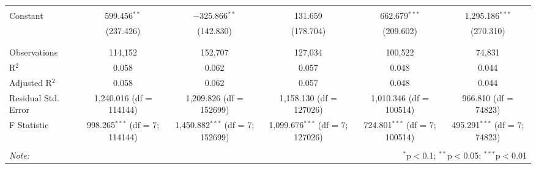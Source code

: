 \begin{table}[!htbp]
\begin{tabular}{@{\extracolsep{5pt}}lccccc}
  & & & & & \\ 
 Constant & 599.456$^{**}$ & $-$325.866$^{**}$ & 131.659 & 662.679$^{***}$ & 1,295.186$^{***}$ \\ 
  & (237.426) & (142.830) & (178.704) & (209.602) & (270.310) \\ 
  & & & & & \\ 
\hline \\[-1.8ex] 
Observations & 114,152 & 152,707 & 127,034 & 100,522 & 74,831 \\ 
R$^{2}$ & 0.058 & 0.062 & 0.057 & 0.048 & 0.044 \\ 
Adjusted R$^{2}$ & 0.058 & 0.062 & 0.057 & 0.048 & 0.044 \\ 
Residual Std. Error & 1,240.016 (df = 114144) & 1,209.826 (df = 152699) & 1,158.130 (df = 127026) & 1,010.346 (df = 100514) & 966.810 (df = 74823) \\ 
F Statistic & 998.265$^{***}$ (df = 7; 114144) & 1,450.882$^{***}$ (df = 7; 152699) & 1,099.676$^{***}$ (df = 7; 127026) & 724.801$^{***}$ (df = 7; 100514) & 495.291$^{***}$ (df = 7; 74823) \\ 
\hline 
\hline \\[-1.8ex] 
\textit{Note:}  & \multicolumn{5}{r}{$^{*}$p$<$0.1; $^{**}$p$<$0.05; $^{***}$p$<$0.01} \\ 
\end{tabular} 
\end{table} 
